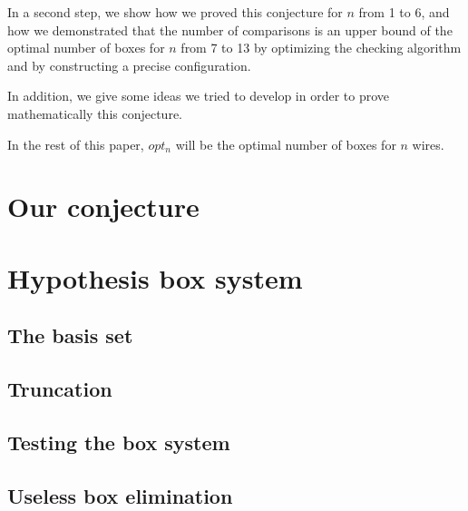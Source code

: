 \documentclass[11pt, a4paper]{article}
\begin{document}
In a second step, we show how we proved this conjecture for $n$ from 1 to 6, and how we demonstrated that the number of comparisons is an upper bound of the optimal number of boxes 
for $n$ from 7 to 13 by optimizing the checking algorithm and by constructing a precise configuration.

In addition, we give some ideas we tried to develop in order to prove mathematically this conjecture.

In the rest of this paper, $opt_n$ will be the optimal number of boxes for $n$ wires.



\section{Our conjecture}


\section{Hypothesis box system}

\subsection{The basis set}

\subsection{Truncation}

\subsection{Testing the box system}

\subsection{Useless box elimination}
\end{document}
